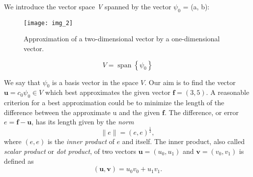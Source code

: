 \documentclass[../main.tex]{subfiles}
\begin{document}
	We introduce the vector space \textit{V} spanned by the vector $\psi_{0}$ = (a, b):
	
	\begin{figure}[H]
		\centering
		\texttt{[image: img\_2]}
		\caption{Approximation of a two-dimensional vector by a one-dimensional vector.}
		\label{fig:img_2}
	\end{figure}
	\begin{equation}\label{eqa2}
		V=\operatorname{span}\left\{\psi_{0}\right\}
	\end{equation}
	
	\noindent We say that $\psi_{0}$ is a basis vector in the space $V$. Our aim is to find the vector $\boldsymbol{u}=c_{0} \psi_{0} \in V$ which best approximates the given vector $\boldsymbol{f}=(3,5)$. A reasonable criterion for a best approximation could be to minimize the length of the difference between the approximate u and the given $\boldsymbol{f}$. The difference, or error $e=\boldsymbol{f}-\boldsymbol{u}$, has its length given by the \textit{norm}
	$$
	\|e\|=(e, e)^{\frac{1}{2}},
	$$
	where $(e, e)$ is the \textit{inner product} of $e$ and itself. The inner product, also called \textit{scalar product} or \textit{dot product}, of two vectors $\boldsymbol{u}=\left(u_{0}, u_{1}\right)$ and $\boldsymbol{v}=\left(v_{0}, v_{1}\right)$ is defined as
	\begin{equation}\label{eqa3}
		(\boldsymbol{u}, \boldsymbol{v})=u_{0} v_{0}+u_{1} v_{1}.
	\end{equation}
	
\end{document}
